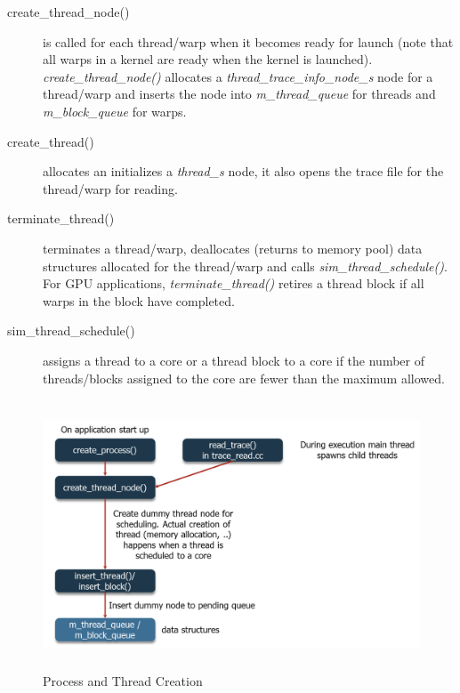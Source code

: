 \begin{description}
\begin{description}
\item [create\_thread\_node()] is called for each thread/warp when it becomes
ready for launch (note that all warps in a kernel are ready when the kernel is
    launched). \textit{create\_thread\_node()} allocates a
\textit{thread\_trace\_info\_node\_s} node for a thread/warp and inserts the
node into \textit{m\_thread\_queue} for threads and \textit{m\_block\_queue}
for warps.

\item [create\_thread()] allocates an initializes a \textit{thread\_s} node, it
also opens the trace file for the thread/warp for reading.


\item [terminate\_thread()] terminates a thread/warp, deallocates (returns to
    memory pool) data structures allocated for the thread/warp and calls
\textit{sim\_thread\_schedule()}. For GPU applications,
  \textit{terminate\_thread()} retires a thread block if all warps in the block
  have completed. 


\item [sim\_thread\_schedule()] assigns a thread to a core or a thread block to
a core if the number of threads/blocks assigned to the core are fewer than the
maximum allowed.

\end{description}

\end{description}


\begin{figure}[htb]
\centering
\includegraphics[height=80mm]{figs/process_creation}
\caption{Process and Thread Creation}
\label{fig:process_creation}
\end{figure}

